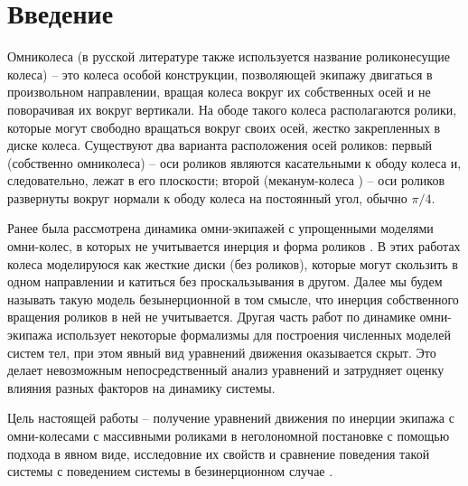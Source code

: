 \section{Введение}

Омниколеса (в русской литературе также используется название роликонесущие колеса) -- это колеса особой конструкции, позволяющей экипажу двигаться в произвольном направлении, вращая колеса вокруг их собственных осей и не поворачивая их вокруг вертикали. На ободе такого колеса располагаются ролики, которые могут свободно вращаться вокруг своих осей, жестко закрепленных в диске колеса. Существуют два варианта расположения осей роликов: первый  (собственно омниколеса) -- оси роликов являются касательными к ободу колеса и, следовательно, лежат в его плоскости; второй (меканум-колеса \cite{mecanum}) -- оси роликов развернуты вокруг нормали к ободу колеса на постоянный угол, обычно $\pi/4$.

Ранее была рассмотрена динамика омни-экипажей с упрощенными моделями омни-колес, в которых не учитывается инерция и форма роликов \cite{ZobovaTatarinov, Martynenko, Borisov, 5to9FromZobova2011}. В этих работах колеса моделируюся как жесткие диски (без роликов), которые могут скользить в одном направлении и катиться без проскальзывания в другом. Далее мы будем называть такую модель безынерционной в том смысле, что инерция собственного вращения роликов в ней не учитывается. Другая часть работ по динамике омни-экипажа \cite{KosenkoGerasimov, MaybeTobolar, Others, 3to4FromZobova2011} использует некоторые формализмы для построения численных моделей систем тел, при этом явный вид уравнений движения оказывается скрыт. Это делает невозможным непосредственный  анализ уравнений и затрудняет оценку влияния разных факторов на динамику системы.


Цель настоящей работы -- получение уравнений движения по инерции экипажа с омни-колесами с массивными роликами в неголономной постановке с помощью подхода \cite{Tatarinov} в явном виде, исследовние их свойств и сравнение поведения такой системы с поведением системы в безинерционном случае \cite{Zobova2011}.